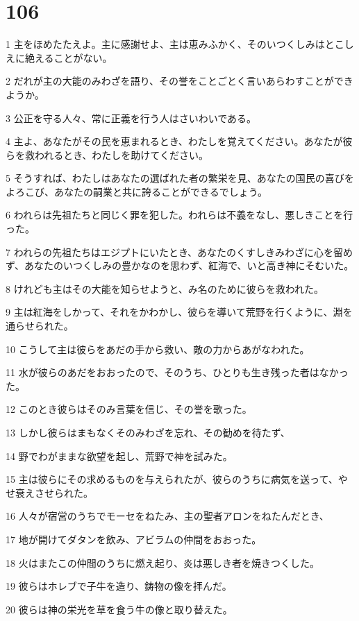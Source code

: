 \chapter{106}

\par 1 主をほめたたえよ。主に感謝せよ、主は恵みふかく、そのいつくしみはとこしえに絶えることがない。
\par 2 だれが主の大能のみわざを語り、その誉をことごとく言いあらわすことができようか。
\par 3 公正を守る人々、常に正義を行う人はさいわいである。
\par 4 主よ、あなたがその民を恵まれるとき、わたしを覚えてください。あなたが彼らを救われるとき、わたしを助けてください。
\par 5 そうすれば、わたしはあなたの選ばれた者の繁栄を見、あなたの国民の喜びをよろこび、あなたの嗣業と共に誇ることができるでしょう。
\par 6 われらは先祖たちと同じく罪を犯した。われらは不義をなし、悪しきことを行った。
\par 7 われらの先祖たちはエジプトにいたとき、あなたのくすしきみわざに心を留めず、あなたのいつくしみの豊かなのを思わず、紅海で、いと高き神にそむいた。
\par 8 けれども主はその大能を知らせようと、み名のために彼らを救われた。
\par 9 主は紅海をしかって、それをかわかし、彼らを導いて荒野を行くように、淵を通らせられた。
\par 10 こうして主は彼らをあだの手から救い、敵の力からあがなわれた。
\par 11 水が彼らのあだをおおったので、そのうち、ひとりも生き残った者はなかった。
\par 12 このとき彼らはそのみ言葉を信じ、その誉を歌った。
\par 13 しかし彼らはまもなくそのみわざを忘れ、その勧めを待たず、
\par 14 野でわがままな欲望を起し、荒野で神を試みた。
\par 15 主は彼らにその求めるものを与えられたが、彼らのうちに病気を送って、やせ衰えさせられた。
\par 16 人々が宿営のうちでモーセをねたみ、主の聖者アロンをねたんだとき、
\par 17 地が開けてダタンを飲み、アビラムの仲間をおおった。
\par 18 火はまたこの仲間のうちに燃え起り、炎は悪しき者を焼きつくした。
\par 19 彼らはホレブで子牛を造り、鋳物の像を拝んだ。
\par 20 彼らは神の栄光を草を食う牛の像と取り替えた。
